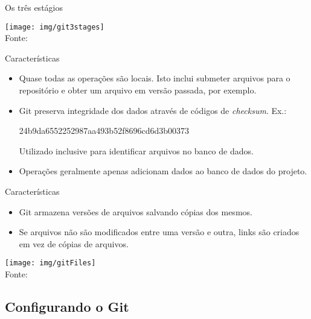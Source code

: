 \documentclass[a4paper]{beamer}
\begin{document}
\begin{frame}{Os três estágios}
\begin{center}
\texttt{[image: img/git3stages]}\\
{\scriptsize Fonte: \cite{proGit}}
\end{center}
\end{frame}

\begin{frame}{Características}

\begin{itemize}[<+->]
\item Quase todas as operações são locais. Isto inclui submeter arquivos para o repositório e obter um arquivo em versão passada, por exemplo.
\item Git preserva integridade dos dados através de códigos de \textit{checksum}. Ex.:
\begin{center}
24b9da6552252987aa493b52f8696cd6d3b00373
\end{center}
Utilizado inclusive para identificar arquivos no banco de dados.
\item Operações geralmente apenas adicionam dados ao banco de dados do projeto.
\end{itemize}

\end{frame}

\begin{frame}{Características}

\begin{itemize}
\item Git armazena versões de arquivos salvando cópias dos mesmos.
\item Se arquivos não são modificados entre uma versão e outra, links são criados em vez de cópias de arquivos.
\end{itemize}

\begin{center}
\texttt{[image: img/gitFiles]}\\
{\scriptsize Fonte: \cite{proGit}}
\end{center}

\end{frame}

\subsection{Configurando o Git}
\end{document}

